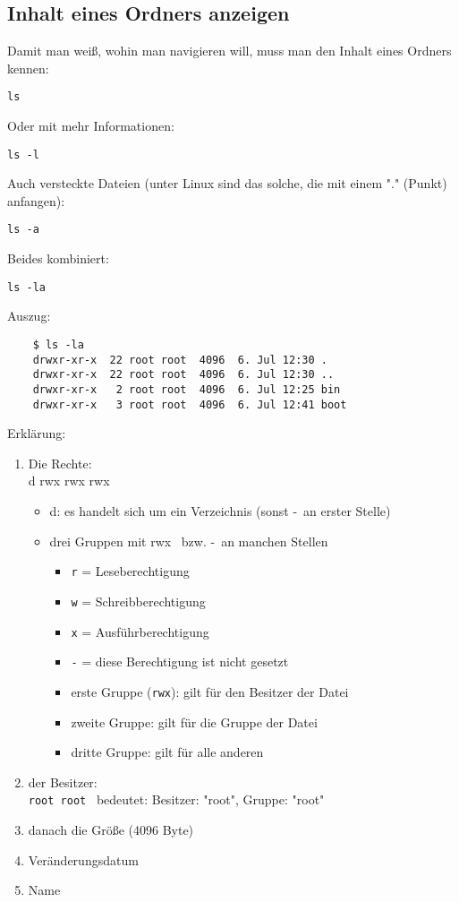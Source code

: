 \documentclass[a4paper,12pt]{article}
\begin{document}
\subsection{Inhalt eines Ordners anzeigen}
Damit man weiß, wohin man navigieren will, muss man den Inhalt eines 
Ordners kennen:  
\begin{lstlisting}
ls
\end{lstlisting} 
Oder mit mehr Informationen: 
\begin{lstlisting}
ls -l
\end{lstlisting} 
Auch versteckte Dateien (unter Linux sind das solche, die mit 
einem "." (Punkt) anfangen):
\begin{lstlisting}
ls -a
\end{lstlisting} 
Beides kombiniert:
\begin{lstlisting}
ls -la
\end{lstlisting} 
Auszug: 
\begin{verbatim}
	$ ls -la
	drwxr-xr-x  22 root root  4096  6. Jul 12:30 .
	drwxr-xr-x  22 root root  4096  6. Jul 12:30 ..
	drwxr-xr-x   2 root root  4096  6. Jul 12:25 bin
	drwxr-xr-x   3 root root  4096  6. Jul 12:41 boot
\end{verbatim}
Erklärung: 
\begin{enumerate}
\item Die Rechte: \\
d rwx rwx rwx
\begin{itemize}
\item d: es handelt sich um ein Verzeichnis (sonst \glqq -\grqq ~an erster Stelle)
\item drei Gruppen mit \glqq rwx\grqq~ bzw. \glqq -\grqq ~an manchen Stellen
\begin{itemize}
\item \texttt{r} = Leseberechtigung
\item \texttt{w} = Schreibberechtigung
\item \texttt{x} = Ausführberechtigung
\item \texttt{\glqq -\grqq} = diese Berechtigung ist nicht gesetzt
\item erste Gruppe (\glqq \texttt{rwx}\grqq ): gilt für den Besitzer der Datei
\item zweite Gruppe: gilt für die Gruppe der Datei
\item dritte Gruppe: gilt für alle anderen
\end{itemize}
\end{itemize}
\item der Besitzer: \\
\texttt{root root} ~bedeutet: Besitzer: "root", Gruppe: "root"
\item danach die Größe (4096 Byte)
\item Veränderungsdatum
\item Name
\end{enumerate}
\end{document}
